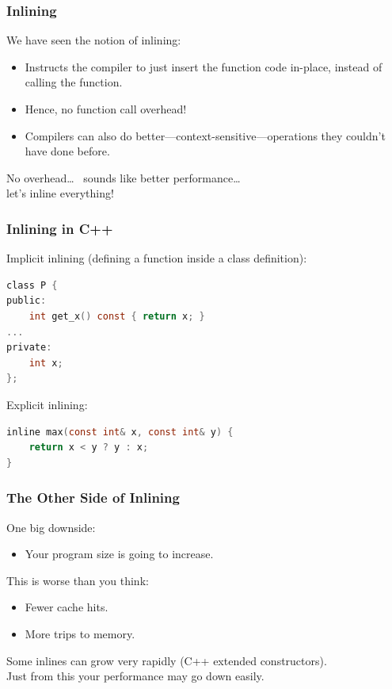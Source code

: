 \begin{frame}
  \frametitle{Inlining}

  

  We have seen the notion of inlining:
  \begin{itemize}
    \item Instructs the compiler to just insert the function code in-place,
      instead of calling the function.
    \item Hence, no function call overhead!
    \item Compilers can also do better---context-sensitive---operations they couldn't
      have done before.
  \end{itemize}
  \vfill
  No overhead\ldots~ sounds like better performance\ldots~ \\let's inline everything!
  
\end{frame}

\begin{frame}[fragile]
  \frametitle{Inlining in C++}

  
  Implicit inlining (defining a function inside a class definition):
  \begin{lstlisting}[language=C]
class P {
public:
    int get_x() const { return x; }
...
private:
    int x;
};
  \end{lstlisting}
  \vfill
Explicit inlining:
  \begin{lstlisting}[language=C]
inline max(const int& x, const int& y) {
    return x < y ? y : x;
}
  \end{lstlisting}
  
\end{frame}

\begin{frame}
  \frametitle{The Other Side of Inlining}

  

  One big downside:
  \begin{itemize}
    \item Your program size is going to increase.
  \end{itemize}
   This is worse than you think:
      \begin{itemize}
        \item Fewer cache hits.
        \item More trips to memory.
      \end{itemize}
   Some inlines can grow very rapidly (C++ extended constructors).\\[1em]
  Just from this your performance may go down easily.
  
\end{frame}


